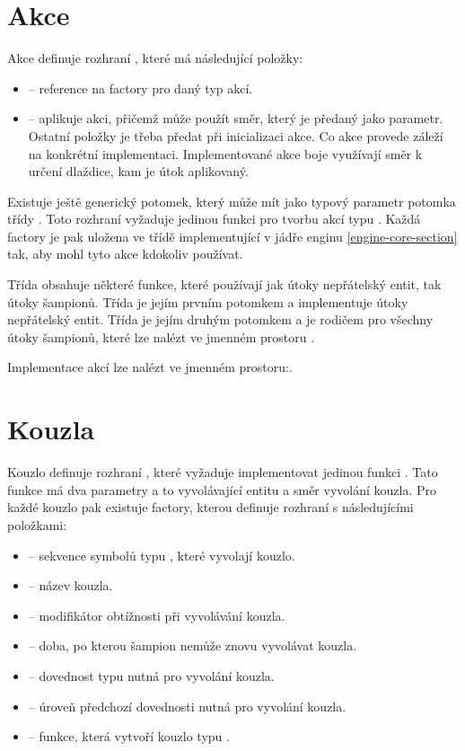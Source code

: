 \section{Akce}
Akce definuje rozhraní , které má následující položky:

\begin{itemize}
\item {} -- reference na factory pro daný typ akcí.
\item {} -- aplikuje akci, přičemž může použít směr, který je předaný jako parametr. Ostatní položky je třeba předat při inicializaci akce. 
	Co akce provede záleží na konkrétní implementaci. Implementované akce boje využívají směr k určení dlaždice, kam je útok aplikovaný.
\end{itemize}

Existuje ještě generický potomek, který může mít jako typový parametr potomka třídy . Toto rozhraní vyžaduje jedinou funkci
 pro tvorbu akcí typu . Každá factory je pak uložena ve třídě implementující  v jádře
enginu \vref{engine-core-section} tak, aby mohl tyto akce kdokoliv používat. 

Třída  obsahuje některé funkce, které používají jak útoky nepřátelský entit, tak útoky šampionů.
Třída  je jejím prvním potomkem a implementuje útoky nepřátelský entit. Třída  
je jejím druhým potomkem a je rodičem pro všechny útoky šampionů, které lze nalézt ve jmenném prostoru .

Implementace akcí lze nalézt ve jmenném prostoru:\newline {}.

\section{Kouzla}
Kouzlo definuje rozhraní , které vyžaduje implementovat jedinou funkci . Tato funkce má dva parametry 
a to vyvolávající entitu a směr vyvolání kouzla. Pro každé kouzlo pak existuje factory, kterou definuje rozhraní  
s následujícími položkami:
\begin{itemize}  
\item {} -- sekvence symbolů typu , které vyvolají kouzlo.
\item {} -- název kouzla. 
\item {} -- modifikátor obtížnosti při vyvolávání kouzla. 
\item {} -- doba, po kterou šampion nemůže znovu vyvolávat kouzla.
\item {} -- dovednost typu  nutná pro vyvolání kouzla.
\item {} -- úroveň předchozí dovednosti nutná pro vyvolání kouzla.
\item {} -- funkce, která vytvoří kouzlo typu .
\end{itemize}  

